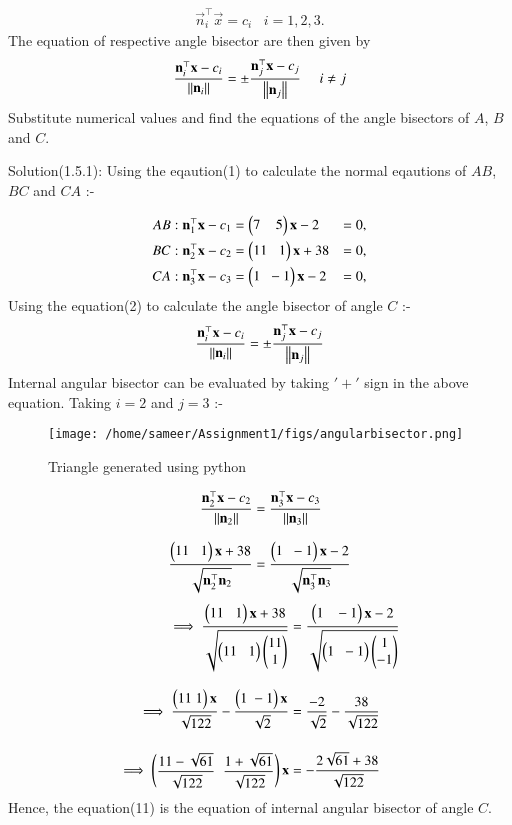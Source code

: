 \documentclass[journal,12pt,twocolumn]{IEEEtran}
\theoremstyle{remark}
\begin{document}
\begin{align}
\vec{n}^{\top}_i\vec{x} = c_i\;\;\; i=1,2,3.
\end{align}
The equation of respective angle bisector are then given by 
\begin{align}
\dfrac{\mathbf{n}^{\top}_i\mathbf{x}-c_i}{\left\lVert\mathbf{n}_i\right\rVert} =  \pm\dfrac{\mathbf{n}^{\top}_j\mathbf{x}-c_j}{\left\lVert\mathbf{n}_j\right\rVert}\,\,\,\,\,\,\,\, i \neq j
\end{align}
Substitute numerical values and find the equations of the angle bisectors of $A$, $B$ and $C$.

Solution(1.5.1):\newline
Using the eqaution(1) to calculate the normal eqautions of $AB$,$BC$ and $CA$ :-

\begin{align}
AB :   \mathbf{n}^{\top}_1\mathbf{x} - c_1  &=  \begin{pmatrix}7 \;\;\;\; 5\end{pmatrix}\mathbf{x} - 2 &=0,\\
BC :   \mathbf{n}^{\top}_2\mathbf{x} - c_2  &=  \begin{pmatrix}11 \;\;\; 1\end{pmatrix}\mathbf{x} + 38 &=0,\\
CA :   \mathbf{n}^{\top}_3\mathbf{x} - c_3  &=  \begin{pmatrix}1 \;\; -1\end{pmatrix}\mathbf{x} - 2 &=0,
\end{align}
Using the equation(2) to calculate the angle bisector of angle $C$ :-
\begin{align}
\dfrac{\mathbf{n}^{\top}_i\mathbf{x}-c_i}{\left\lVert\mathbf{n}_i\right\rVert} =  \pm\dfrac{\mathbf{n}^{\top}_j\mathbf{x}-c_j}{\left\lVert\mathbf{n}_j\right\rVert}
\end{align}
Internal angular bisector can be evaluated by taking $'+'$ sign in the above equation.\newline
Taking $i=2$ and $j=3$ :-
\begin{figure}
\centering
\texttt{[image: /home/sameer/Assignment1/figs/angularbisector.png]}
\caption{Triangle generated using python}
\label{fig: Angular bisector}
\end{figure}
\begin{align}
\dfrac{\mathbf{n}^{\top}_2\mathbf{x}-c_2}{\left\lVert\mathbf{n}_2\right\rVert} &=  \dfrac{\mathbf{n}^{\top}_3\mathbf{x}-c_3}{\left\lVert\mathbf{n}_3\right\rVert}\\[8pt]
\dfrac{\begin{pmatrix}11\;\;\;1\end{pmatrix}\mathbf{x}+38}{\sqrt{\mathbf{n}^{\top}_2\mathbf{n}_2}} &=  \dfrac{\begin{pmatrix}1\;\;-1\end{pmatrix}\mathbf{x}-2}{\sqrt{\mathbf{n}^{\top}_3 \mathbf{n}_3}}
\end{align}
\begin{align}
\implies\dfrac{\begin{pmatrix}11\;\;\;1\end{pmatrix}\mathbf{x}+38}{\sqrt{\begin{pmatrix}11\;\;\;1\end{pmatrix}\begin{pmatrix}11\\1\end{pmatrix}}}&=\dfrac{\begin{pmatrix}1\;\;\;-1\end{pmatrix}\mathbf{x}-2}{\sqrt{\begin{pmatrix}1\;\;-1\end{pmatrix}\begin{pmatrix}1\\-1\end{pmatrix}}}\\[8pt]
\implies\dfrac{\begin{pmatrix}11\;1\end{pmatrix}\mathbf{x}}{\sqrt{122}} - \dfrac{\begin{pmatrix}1\;-1\end{pmatrix}\mathbf{x}}{\sqrt{2}}&=\dfrac{-2}{\sqrt{2}} - \dfrac{38}{\sqrt{122}}\\[12pt]
\implies\begin{pmatrix}\dfrac{11-\sqrt{61}}{\sqrt{122}} \;\; \dfrac{1+\sqrt{61}}{\sqrt{122}}\end{pmatrix}\mathbf{x}&=-\dfrac{2\sqrt{61}+38}{\sqrt{122}}
\end{align}
Hence, the equation(11) is the equation of internal angular bisector of angle $C$.
\end{document}
